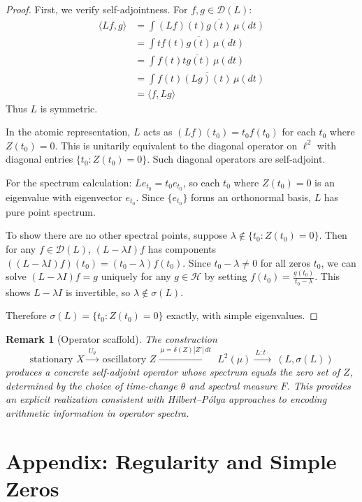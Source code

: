 \documentclass{article}
\newtheorem{remark}[theorem]{Remark}
\begin{document}
\begin{proof}
First, we verify self-adjointness. For $f,g\in\mathcal{D}(L)$:
\begin{align}
\langle Lf,g\rangle &= \int (Lf)(t)\overline{g(t)}\,\mu(dt)\\
&= \int t f(t)\overline{g(t)}\,\mu(dt)\\
&= \int f(t)\overline{t g(t)}\,\mu(dt)\\
&= \int f(t)\overline{(Lg)(t)}\,\mu(dt)\\
&= \langle f,Lg\rangle
\end{align}
Thus $L$ is symmetric. 

In the atomic representation, $L$ acts as $(Lf)(t_0)=t_0 f(t_0)$ for each $t_0$ where $Z(t_0)=0$. This is unitarily equivalent to the diagonal operator on $\ell^2$ with diagonal entries $\{t_0:Z(t_0)=0\}$. Such diagonal operators are self-adjoint.

For the spectrum calculation: $Le_{t_0}=t_0 e_{t_0}$, so each $t_0$ where $Z(t_0)=0$ is an eigenvalue with eigenvector $e_{t_0}$. Since $\{e_{t_0}\}$ forms an orthonormal basis, $L$ has pure point spectrum.

To show there are no other spectral points, suppose $\lambda\notin\{t_0:Z(t_0)=0\}$. Then for any $f\in\mathcal{D}(L)$, $(L-\lambda I)f$ has components $((L-\lambda I)f)(t_0)=(t_0-\lambda)f(t_0)$. Since $t_0-\lambda\neq 0$ for all zeros $t_0$, we can solve $(L-\lambda I)f=g$ uniquely for any $g\in\mathcal{H}$ by setting $f(t_0)=\frac{g(t_0)}{t_0-\lambda}$. This shows $L-\lambda I$ is invertible, so $\lambda\notin\sigma(L)$.

Therefore $\sigma(L)=\{t_0:Z(t_0)=0\}$ exactly, with simple eigenvalues.
\end{proof}

\begin{remark}[Operator scaffold]\label{rem:scaffold}
The construction
\[
\text{stationary }X \xrightarrow{\ U_\theta\ }\ \text{oscillatory }Z \xrightarrow{\ \mu=\delta(Z)|Z'|\,dt\ }\ L^2(\mu)\xrightarrow{\ L:t\cdot\ }\ (L,\sigma(L))
\]
produces a concrete self-adjoint operator whose spectrum equals the zero set of $Z$, determined by the choice of time-change $\theta$ and spectral measure $F$. This provides an explicit realization consistent with Hilbert--P\'olya approaches to encoding arithmetic information in operator spectra.
\end{remark}

\section{Appendix: Regularity and Simple Zeros}\label{sec:appendix}
\end{document}

